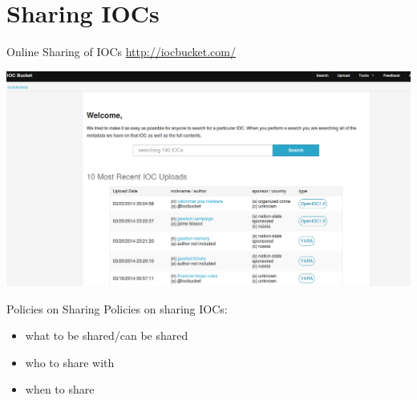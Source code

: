 \documentclass[presentation,smaller]{beamer}
\begin{document}
\section{Sharing IOCs}
\label{sec-4}
\begin{frame}[label=sec-4-1]{Online Sharing of IOCs}
\url{http://iocbucket.com/}

\includegraphics[width=.9\linewidth]{images/iocbucket.png}
\end{frame}
\begin{frame}[label=sec-4-2]{Policies on Sharing}
Policies on sharing IOCs:

\begin{itemize}
\item what to be shared/can be shared
\item who to share with
\item when to share
\end{itemize}
\end{frame}
\end{document}
